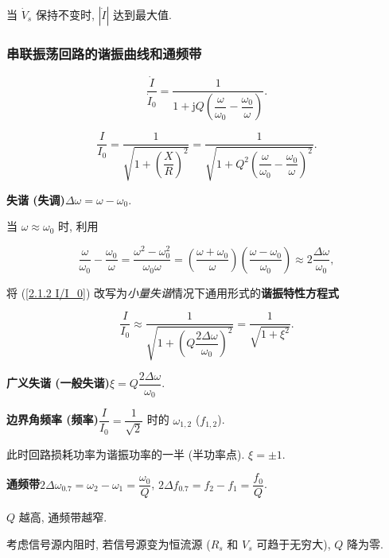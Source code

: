 \documentclass{notes}
\begin{document}
当 $\dot{V}_s$ 保持不变时, $|\dot{I}|$ 达到最大值.

\subsubsection{串联振荡回路的谐振曲线和通频带} \label{串联振荡回路的谐振曲线和通频带}

\begin{equation}
    \frac{\dot{I}}{\dot{I}_0}=\frac{1}{1+\mathrm{j}Q\left(\dfrac{\omega}{\omega_0}-\dfrac{\omega_0}{\omega}\right)}.
\end{equation}

\begin{equation}\label{2.1.2 I/I_0}
    \frac{I}{I_0}=\frac{1}{\sqrt{1+\left(\dfrac{X}{R}\right)^2}}=\frac{1}{\sqrt{1+Q^2\left(\dfrac{\omega}{\omega_0}-\dfrac{\omega_0}{\omega}\right)^2}}.
\end{equation}

\textbf{失谐 (失调)}\quad $\Delta\omega=\omega-\omega_0$.

当 $\omega\approx\omega_0$ 时, 利用

\begin{equation*}
    \frac{\omega}{\omega_0}-\frac{\omega_0}{\omega}=\frac{\omega^2-\omega_0^2}{\omega_0\omega}=\left(\frac{\omega+\omega_0}{\omega}\right)\left(\frac{\omega-\omega_0}{\omega_0}\right)\approx 2\frac{\Delta\omega}{\omega_0},
\end{equation*}

\noindent 将 (\ref{2.1.2 I/I_0}) 改写为\textit{小量失谐}情况下通用形式的\textbf{谐振特性方程式}

\begin{equation}
    \frac{I}{I_0}\approx\frac{1}{\sqrt{1+\left(Q\dfrac{2\Delta\omega}{\omega_0}\right)^2}}=\frac{1}{\sqrt{1+\xi^2}}.
\end{equation}

\textbf{广义失谐 (一般失谐)}\quad $\xi=Q\dfrac{2\Delta\omega}{\omega_0}$.

\textbf{边界角频率 (频率)}\quad $\dfrac{I}{I_0}=\dfrac{1}{\sqrt{2}}$ 时的 $\omega_{1,2}$ ($f_{1,2}$).

此时回路损耗功率为谐振功率的一半 (半功率点). $\xi=\pm 1$.

\textbf{通频带}\quad $2\Delta\omega_{0.7}=\omega_2-\omega_1=\dfrac{\omega_0}{Q}$, $2\Delta f_{0.7}=f_2-f_1=\dfrac{f_0}{Q}$.

$Q$ 越高, 通频带越窄.

考虑信号源内阻时, 若信号源变为恒流源 ($R_s$ 和 $V_s$ 可趋于无穷大), $Q$ 降为零.
\end{document}
